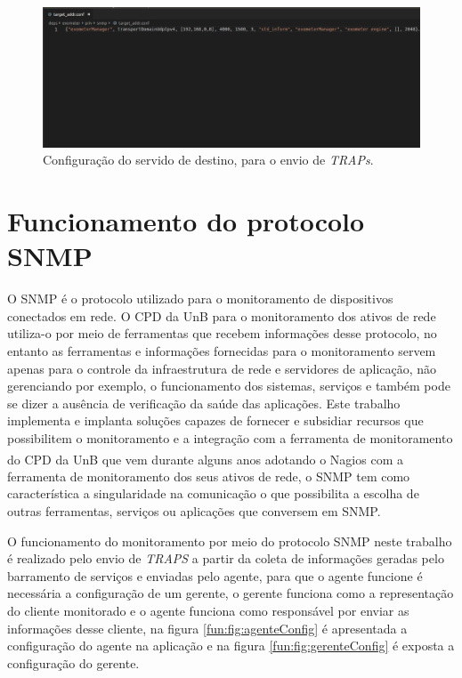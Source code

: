 \begin{figure}[h!]
	\begin{center}
	\includegraphics[scale = 0.50]{img/enderecoEnvioAgente.png}
	\caption{Configuração do servido de destino, para o envio de \textit{TRAPs}.}
	\label{fun:fig:enderecoAgenteSNMP}
	\end{center}
\end{figure}


\section{Funcionamento do protocolo \acrshort{SNMP}}
\label{integracao_snmp}
O \acrshort{SNMP} é o protocolo utilizado para o monitoramento de dispositivos conectados em rede. O \acrshort{CPD} da \acrshort{UnB} para o monitoramento dos ativos de rede utiliza-o por meio de ferramentas que recebem informações desse protocolo, no entanto as ferramentas e informações fornecidas para o monitoramento servem apenas para o controle da infraestrutura de rede e servidores de aplicação, não gerenciando por exemplo, o funcionamento dos sistemas, serviços e também pode se dizer a ausência de verificação da saúde das aplicações. Este trabalho implementa e implanta soluções capazes de fornecer e subsidiar recursos que possibilitem o monitoramento e a integração com a ferramenta de monitoramento do \acrshort{CPD} da \acrshort{UnB} que vem durante alguns anos adotando o Nagios\textsuperscript{\textregistered} com a ferramenta de monitoramento dos seus ativos de rede, o \acrshort{SNMP} tem como característica a singularidade na comunicação o que possibilita a escolha de outras ferramentas, serviços ou aplicações que conversem em \acrshort{SNMP}. 

O funcionamento do monitoramento por meio do protocolo \acrshort{SNMP} neste trabalho é realizado pelo envio de \textit{TRAPS} a partir da coleta de informações geradas pelo barramento de serviços e enviadas pelo agente, para que o agente funcione é necessária a configuração de um gerente, o gerente funciona como a representação do cliente monitorado e o agente funciona como responsável por enviar as informações desse cliente, na figura \ref{fun:fig:agenteConfig} é apresentada a configuração do agente na aplicação e na figura \ref{fun:fig:gerenteConfig} é exposta a configuração do gerente. 

